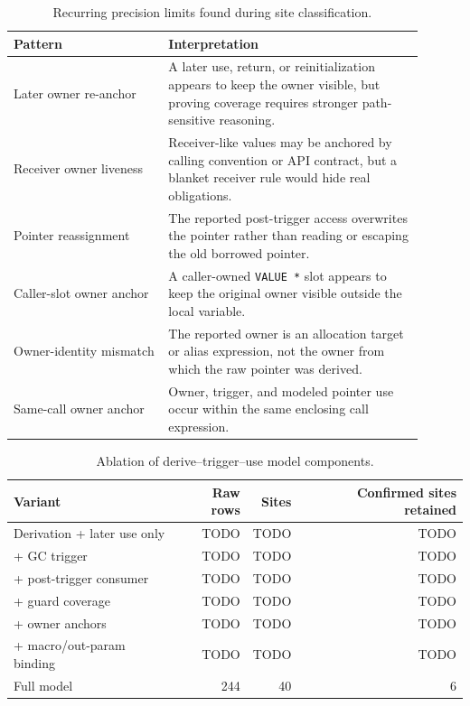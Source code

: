 \begin{table}[t]
\caption{Recurring precision limits found during site classification.}
\label{tab:model-feedback}
\centering
\scriptsize
\begin{tabular}{@{}p{0.34\linewidth}p{0.56\linewidth}@{}}
\toprule
Pattern & Interpretation \\
\midrule
Later owner re-anchor & A later use, return, or reinitialization appears to keep the owner visible, but proving coverage requires stronger path-sensitive reasoning. \\
Receiver owner liveness & Receiver-like values may be anchored by calling convention or API contract, but a blanket receiver rule would hide real obligations. \\
Pointer reassignment & The reported post-trigger access overwrites the pointer rather than reading or escaping the old borrowed pointer. \\
Caller-slot owner anchor & A caller-owned \texttt{VALUE *} slot appears to keep the original owner visible outside the local variable. \\
Owner-identity mismatch & The reported owner is an allocation target or alias expression, not the owner from which the raw pointer was derived. \\
Same-call owner anchor & Owner, trigger, and modeled pointer use occur within the same enclosing call expression. \\
\bottomrule
\end{tabular}
\end{table}

\begin{table}[t]
\caption{Ablation of derive--trigger--use model components.}
\label{tab:ablation}
\centering
\scriptsize
\begin{tabular}{@{}lrrr@{}}
\toprule
Variant & Raw rows & Sites & Confirmed sites retained \\
\midrule
Derivation + later use only & TODO & TODO & TODO \\
+ GC trigger & TODO & TODO & TODO \\
+ post-trigger consumer & TODO & TODO & TODO \\
+ guard coverage & TODO & TODO & TODO \\
+ owner anchors & TODO & TODO & TODO \\
+ macro/out-param binding & TODO & TODO & TODO \\
Full model & 244 & 40 & 6 \\
\bottomrule
\end{tabular}
\end{table}

